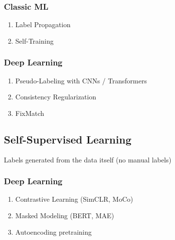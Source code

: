 \begin{table}[H]
\begin{minipage}{0.45\linewidth}
\subsubsection*{Classic ML}
\begin{enumerate}
    \item Label Propagation
    \item Self-Training
\end{enumerate}
\end{minipage}
\begin{minipage}{0.45\linewidth}
\subsubsection*{Deep Learning}
\begin{enumerate}
    \item Pseudo-Labeling with CNNs / Transformers
    \item Consistency Regularization
    \item FixMatch
\end{enumerate}
\end{minipage}
\end{table}



\subsection*{Self-Supervised Learning}

Labels generated from the data itself (no manual labels)




\subsubsection*{Deep Learning}

\begin{enumerate}
    \item Contrastive Learning (SimCLR, MoCo)
    
    \item Masked Modeling (BERT, MAE)

    \item Autoencoding pretraining
\end{enumerate}






